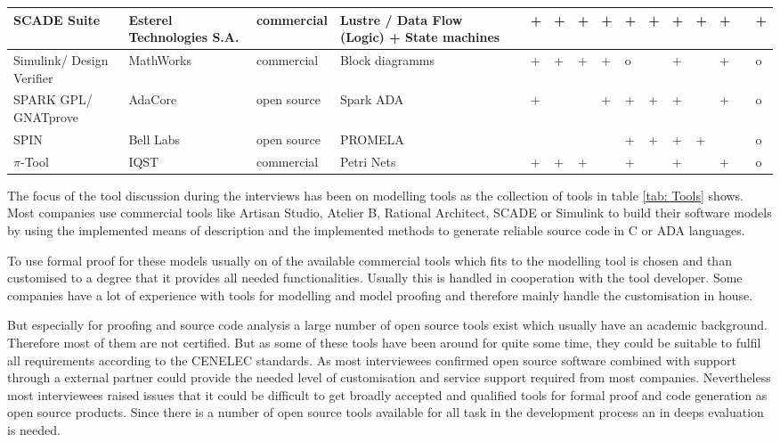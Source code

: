 \documentclass{./template/openetcs_report}
\begin{document}
\begin{landscape}
\begin{center}
\begin{longtable}{|m{2.5cm}|p{3cm}|m{1.8cm}|p{3.5cm}||m{1.2cm}|m{0.2cm}|m{0.2cm}|m{0.2cm}|m{0.7cm}|m{0.2cm}|m{0.7cm}|m{0.2cm}|m{0.6cm}|m{1.2cm}|m{0.2cm}|m{0.2cm}|}
SCADE Suite &Esterel Technologies S.A.&commercial&Lustre / Data Flow (Logic) + State machines&&+&+&+&+&+&+&+&+&+&&+ \\ \hline
Simulink/ Design Verifier&MathWorks&commercial&Block diagramms&&+&+&+&+&o&&+&&+&&o \\ \hline
SPARK GPL/ GNATprove&AdaCore&open source&Spark ADA&&+&&&+&+&+&+&&+&&o \\ \hline
SPIN&Bell Labs&open source&PROMELA&&&&&&+&+&+&+&&&o \\ \hline
$\pi$-Tool&IQST&commercial&Petri Nets&&+&+&+&&+&&+&&+&&o \\ \hline

\end{longtable}

\end{center}
\end{landscape}

The focus of the tool discussion during the interviews has been on modelling tools as the collection of tools in table \ref{tab: Tools} shows. Most companies use commercial tools like Artisan Studio, Atelier B,  Rational Architect,  SCADE or Simulink to build their software models by using the implemented means of description and the implemented methods to generate reliable source code in C or ADA languages. 

To use formal proof for these models usually on of the available commercial tools which fits to the modelling tool is chosen and than customised to a degree that it provides all needed functionalities. Usually this is handled in cooperation with the tool developer. Some companies have a lot of experience with tools for modelling and model proofing and therefore mainly handle the customisation in house.

But especially for proofing and source code analysis a large number of open source tools exist which usually have an academic background. Therefore most of them are not certified. But as some of these tools have been around for quite some time, they could be suitable to fulfil all requirements according to the CENELEC standards. As most interviewees confirmed open source software combined with support through a external partner could provide the needed level of customisation and service support required from most companies. Nevertheless most interviewees raised issues that it could be difficult to get broadly accepted and qualified tools for formal proof and code generation as open source products. Since there is a number of open source tools available for all task in the development process an in deeps evaluation is needed. 
\end{document}

